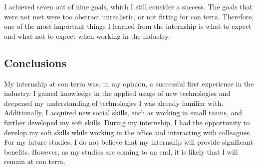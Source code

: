 \documentclass[11pt, titlepage, a4paper]{article}
\begin{document}
I achieved seven out of nine goals, which I still consider a success. The goals that were not met were too abstract unrealistic, or not fitting for con terra. Therefore, one of the most important things I learned from the internship is what to expect and what not to expect when working in the industry.

\subsection{Conclusions}

My internship at con terra was, in my opinion, a successful first experience in the industry. I gained knowledge in the applied usage of new technologies and deepened my understanding of technologies I was already familiar with. Additionally, I acquired new social skills, such as working in small teams, and further developed my soft skills. During my internship, I had the opportunity to develop my soft skills while working in the office and interacting with colleagues.
For my future studies, I do not believe that my internship will provide significant benefits. However, as my studies are coming to an end, it is likely that I will remain at con terra.

\clearpage
\end{document}
